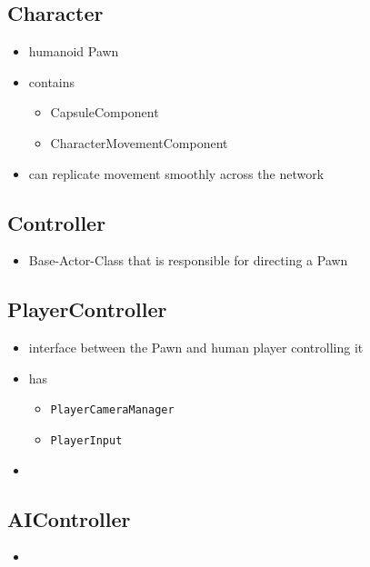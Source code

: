 \documentclass{scrbook}
\newcommand{\code}[1]{\colorbox{mygray}{\lstinline|#1|}}
\begin{document}
            \subsection{Character}
                \begin{itemize}
                    \item humanoid Pawn
                    \item contains
                    \begin{itemize}
                        \item CapsuleComponent
                        \item CharacterMovementComponent
                    \end{itemize}
                    \item can replicate movement smoothly across the network
                \end{itemize}
            \subsection{Controller}
                \begin{itemize}
                    \item Base-Actor-Class that is responsible for directing a Pawn
                \end{itemize}
            \subsection{PlayerController}
                \begin{itemize}
                    \item interface between the Pawn and human player controlling it
                    \item has
                    \begin{itemize}
                        \item \code{PlayerCameraManager}
                        \item \code{PlayerInput}
                    \end{itemize} 
                    \item 
                \end{itemize}
            \subsection{AIController}
                \begin{itemize}
                    \item 
                \end{itemize}
\end{document}
